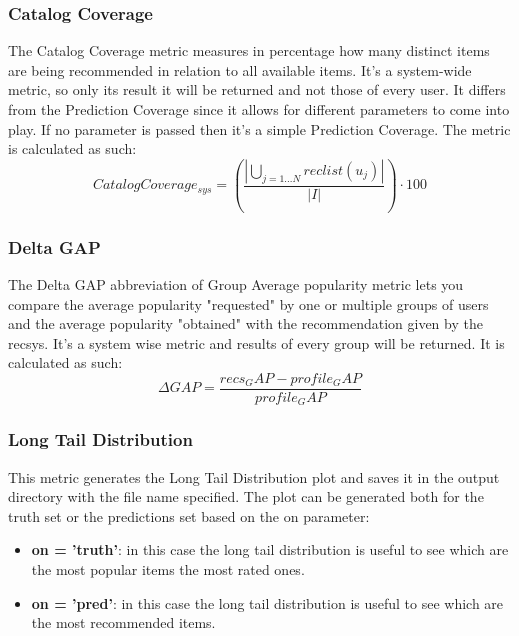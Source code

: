 
\subsubsection{Catalog Coverage}\label{subsubsec:cat_cov}
The Catalog Coverage metric measures in percentage how many distinct items are being recommended in relation
to all available items.
It's a system-wide metric, so only its result it will be returned and not those of every user.
It differs from the Prediction Coverage since it allows for different parameters to come into play.
If no parameter is passed then it's a simple Prediction Coverage.
The metric is calculated as such:
\hfill\break
\hfill\break
    \[
         Catalog Coverage_{sys} = (\frac{|\bigcup_{j=1...N}reclist(u_j)|}{|I|})\cdot100
    \]
\hfill\break


\subsubsection{Delta GAP}\label{subsubsec:dg}
The Delta GAP abbreviation of Group Average popularity metric lets you compare the average popularity "requested" by
one or multiple groups of users and the average popularity "obtained" with the recommendation given by the recsys.
It's a system wise metric and results of every group will be returned.
It is calculated as such:
\hfill\break
\hfill\break
    \[
        \Delta GAP = \frac{recs_GAP - profile_GAP}{profile_GAP}
    \]
\hfill\break


\subsubsection{Long Tail Distribution}\label{subsubsec:ltd}
This metric generates the Long Tail Distribution plot and saves it in the output directory with the file name
specified.
The plot can be generated both for the truth set or the predictions set based on the on parameter:
\begin{itemize}
    \item \textbf{on = 'truth'}: in this case the long tail distribution is useful to see which are the most popular items
       the most rated ones.
    \item \textbf{on = 'pred'}: in this case the long tail distribution is useful to see which are the most recommended
        items.
\end{itemize}

